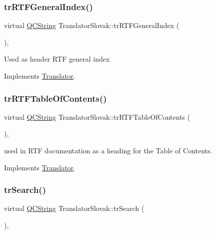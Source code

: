 \subsubsection{\texorpdfstring{trRTFGeneralIndex()}{trRTFGeneralIndex()}}
{\footnotesize\ttfamily virtual \mbox{\hyperlink{class_q_c_string}{Q\+C\+String}} Translator\+Slovak\+::tr\+R\+T\+F\+General\+Index (\begin{DoxyParamCaption}{ }\end{DoxyParamCaption})\hspace{0.3cm}{\ttfamily [inline]}, {\ttfamily [virtual]}}

Used as header R\+TF general index 

Implements \mbox{\hyperlink{class_translator}{Translator}}.

\mbox{\label{class_translator_slovak_ac839def36a70430a69deb2f95790c24d}} 
\subsubsection{\texorpdfstring{trRTFTableOfContents()}{trRTFTableOfContents()}}
{\footnotesize\ttfamily virtual \mbox{\hyperlink{class_q_c_string}{Q\+C\+String}} Translator\+Slovak\+::tr\+R\+T\+F\+Table\+Of\+Contents (\begin{DoxyParamCaption}{ }\end{DoxyParamCaption})\hspace{0.3cm}{\ttfamily [inline]}, {\ttfamily [virtual]}}

used in R\+TF documentation as a heading for the Table of Contents. 

Implements \mbox{\hyperlink{class_translator}{Translator}}.

\mbox{\label{class_translator_slovak_ac4c8519dd47721afc77abdd37ebaa41f}} 
\subsubsection{\texorpdfstring{trSearch()}{trSearch()}}
{\footnotesize\ttfamily virtual \mbox{\hyperlink{class_q_c_string}{Q\+C\+String}} Translator\+Slovak\+::tr\+Search (\begin{DoxyParamCaption}{ }\end{DoxyParamCaption})\hspace{0.3cm}{\ttfamily [inline]}, {\ttfamily [virtual]}}

